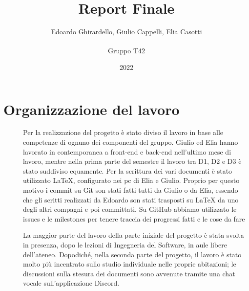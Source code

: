 \documentclass{article}
\title{\textbf{\Huge Report Finale}}
\author{Edoardo Ghirardello, Giulio Cappelli, Elia Casotti \\ \\ Gruppo T42}
\date{2022}
\begin{document}
\maketitle

\clearpage
\tableofcontents
\clearpage

\section{Organizzazione del lavoro}
\begin{description}
    \item[] Per la realizzazione del progetto è stato diviso il lavoro in base alle competenze di ognuno dei componenti del gruppo.
        Giulio ed Elia hanno lavorato in contemporanea a front-end e back-end nell'ultimo mese di lavoro, mentre nella prima parte del semestre il lavoro tra D1, D2 e D3 è stato suddiviso equamente.
        Per la scrittura dei vari documenti è stato utilizzato LaTeX, configurato nei pc di Elia e Giulio. Proprio per questo motivo i commit su Git son stati fatti tutti da Giulio o da Elia, essendo che gli scritti realizzati da Edoardo son stati trasposti su LaTeX da uno degli altri compagni e poi committati.
        Su GitHub abbiamo utilizzato le issues e le milestones per tenere traccia dei progressi fatti e le cose da fare
    \item[] La maggior parte del lavoro della parte iniziale del progetto è stata svolta in presenza, dopo le lezioni di Ingegneria del Software, in aule libere dell'ateneo.
        Dopodiché, nella seconda parte del progetto, il lavoro è stato molto più incentrato sullo studio individuale nelle proprie abitazioni; le discussioni sulla stesura dei documenti sono avvenute tramite una chat vocale sull'applicazione Discord.
\end{description}
\clearpage
\end{document}
